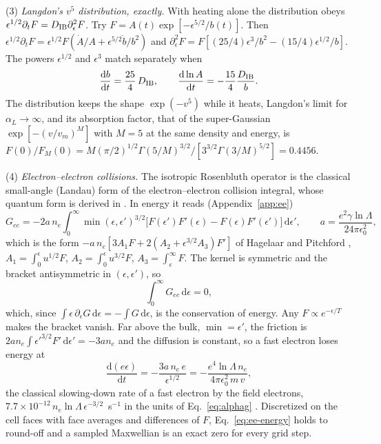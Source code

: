 \documentclass[11pt]{article}
\numberwithin{equation}{section}
\newcommand{\dd}{\mathrm d}
\newcommand{\lnL}{\ln\Lambda}
\begin{document}
{\noindent}(3) \emph{Langdon's $v^5$ distribution, exactly.} With heating alone the
distribution obeys $\epsilon^{1/2}\partial_tF=D_{\rm IB}\partial_\epsilon^2F$. Try
$F=A(t)\exp[-\epsilon^{5/2}/b(t)]$. Then
$\epsilon^{1/2}\partial_tF=\epsilon^{1/2}F(\dot A/A+\epsilon^{5/2}\dot b/b^2)$ and
$\partial_\epsilon^2F=F[(25/4)\epsilon^3/b^2-(15/4)\epsilon^{1/2}/b]$. The powers
$\epsilon^{1/2}$ and $\epsilon^3$ match separately when
\begin{equation}
\frac{\dd b}{\dd t}=\frac{25}{4}\,D_{\rm IB},\qquad \frac{\dd\ln A}{\dd t}=-\frac{15}{4}\frac{D_{\rm IB}}{b}.
\label{eq:v5}
\end{equation}
The distribution keeps the shape $\exp(-v^5)$ while it heats, Langdon's limit for
$\alpha_L\to\infty$, and its absorption factor, that of the super-Gaussian
$\exp[-(v/v_m)^M]$ with $M=5$ at the same density and energy, is
$F(0)/F_M(0)=M(\pi/2)^{1/2}\Gamma(5/M)^{3/2}/[3^{3/2}\Gamma(3/M)^{5/2}]=0.4456$.

{\noindent}(4) \emph{Electron--electron collisions.} The isotropic Rosenbluth
operator \cite{Rosenbluth1957} is the classical small-angle (Landau) form of the
electron--electron collision integral, whose quantum form is derived in \cite{QBE}.
In energy it reads (Appendix~\ref{app:ee})
\begin{equation}
G_{ee}=-2a\,n_e\int_0^\infty\min(\epsilon,\epsilon')^{3/2}\big[F(\epsilon')F'(\epsilon)-F(\epsilon)F'(\epsilon')\big]\,\dd\epsilon',\qquad
a=\frac{e^2\gamma\lnL}{24\pi\epsilon_0^2},
\label{eq:ee-landau}
\end{equation}
which is the form $-a\,n_e[3A_1F+2(A_2+\epsilon^{3/2}A_3)F']$ of Hagelaar and
Pitchford \cite{HP2005}, $A_1=\int_0^\epsilon u^{1/2}F$, $A_2=\int_0^\epsilon u^{3/2}F$,
$A_3=\int_\epsilon^\infty F$. The kernel is symmetric and the bracket
antisymmetric in $(\epsilon,\epsilon')$, so
\begin{equation}
\int_0^\infty G_{ee}\,\dd\epsilon=0,
\label{eq:ee-energy}
\end{equation}
which, since $\int\epsilon\,\partial_\epsilon G\,\dd\epsilon=-\int G\,\dd\epsilon$,
is the conservation of energy. Any $F\propto e^{-\epsilon/T}$ makes the bracket
vanish. Far above the bulk, $\min=\epsilon'$, the friction is
$2an_e\int\epsilon'^{3/2}F'\,\dd\epsilon'=-3an_e$ and the diffusion is constant,
so a fast electron loses energy at
\begin{equation}
\frac{\dd(e\epsilon)}{\dd t}=-\frac{3a\,n_e\,e}{\epsilon^{1/2}}
=-\frac{e^4\lnL\,n_e}{4\pi\epsilon_0^2\,m\,v},
\label{eq:spitzer}
\end{equation}
the classical slowing-down rate of a fast electron by the field electrons,
$7.7\times10^{-12}\,n_e\lnL\,\epsilon^{-3/2}$~s$^{-1}$ in the units of
Eq.~\eqref{eq:alphag} \cite{NRL}. Discretized on the cell faces with face averages and
differences of $F$, Eq.~\eqref{eq:ee-energy} holds to round-off and a sampled
Maxwellian is an exact zero for every grid step.
\end{document}
